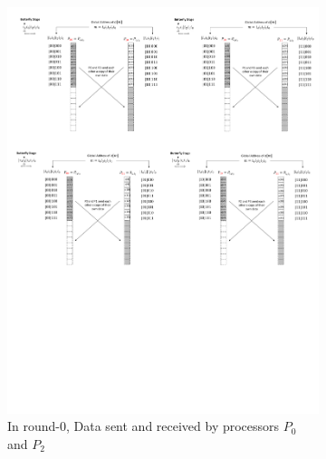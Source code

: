 \documentclass{iacrtrans}
\theoremstyle{plain}
\begin{document}
\begin{figure}[!tb]
\centering
\begin{subfigure}[b]{0.47\textwidth}
\includegraphics[width=\textwidth]{./fig/DataSwapWithoutPerm1.pdf}
\caption{In round-0, Data sent and received by processors $P_0$ and $P_2$}\label{fig:dataswap_without_perm1}
\end{subfigure}
\hspace{1em}
\begin{subfigure}[b]{.47\textwidth}\centering

\end{subfigure}
\end{figure}
\end{document}
